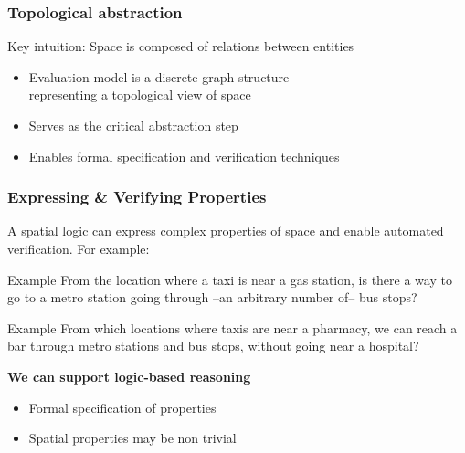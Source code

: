\documentclass[pdf,10pt]{beamer}
\begin{document}
\begin{frame}[t]\frametitle{Topological abstraction}
\vspace{2.6cm}
\textcolor{mLightBrown}{Key intuition:} Space is composed of relations between entities
\begin{itemize} 
 \item Evaluation model is a discrete graph structure \\representing a topological view of space 
 \item Serves as the critical abstraction step 
\item Enables formal specification and verification techniques
 \end{itemize}
\end{frame}









\begin{frame}[t]\frametitle{Expressing \& Verifying Properties}

A \textcolor{mLightBrown}{spatial logic} can express complex properties of space and enable automated verification. For example: %

\begin{exampleblock}{Example}
From the location where a taxi is near a gas station, is there a way to go to a metro station going through --an arbitrary number of-- bus stops? 
\end{exampleblock}


\begin{exampleblock}{Example}
From which locations where taxis are near a pharmacy, we can reach a bar through metro stations and bus stops, without going near a hospital? 
\end{exampleblock}

\textbf{We can support logic-based reasoning }
\begin{itemize}
\item Formal specification of properties
 \item Spatial properties may be non trivial
\end{itemize}
\end{frame}
\end{document}
